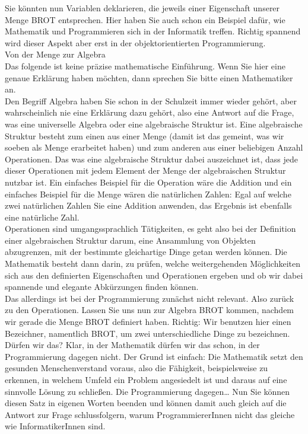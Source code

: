 Sie könnten nun Variablen deklarieren, die jeweils einer Eigenschaft unserer Menge BROT entsprechen. Hier haben Sie auch schon ein Beispiel dafür, wie Mathematik und Programmieren sich in der Informatik treffen. Richtig spannend wird dieser Aspekt aber erst in der objektorientierten Programmierung.\\

Von der Menge zur Algebra\\

Das folgende ist keine präzise mathematische Einführung. Wenn Sie hier eine genaue Erklärung haben möchten, dann sprechen Sie bitte einen Mathematiker an.\\

Den Begriff Algebra haben Sie schon in der Schulzeit immer wieder gehört, aber wahrscheinlich nie eine Erklärung dazu gehört, also eine Antwort auf die Frage, was eine universelle Algebra oder eine algebraische Struktur ist. Eine algebraische Struktur besteht zum einen aus einer Menge (damit ist das gemeint, was wir soeben als Menge erarbeitet haben) und zum anderen aus einer beliebigen Anzahl Operationen. Das was eine algebraische Struktur dabei auszeichnet ist, dass jede dieser Operationen mit jedem Element der Menge der algebraischen Struktur nutzbar ist. Ein einfaches Beispiel für die Operation wäre die Addition und ein einfaches Beispiel für die Menge wären die natürlichen Zahlen: Egal auf welche zwei natürlichen Zahlen Sie eine Addition anwenden, das Ergebnis ist ebenfalls eine natürliche Zahl.\\

Operationen sind umgangssprachlich Tätigkeiten, es geht also bei der Definition einer algebraischen Struktur darum, eine Ansammlung von Objekten abzugrenzen, mit der bestimmte gleichartige Dinge getan werden können. Die Mathematik besteht dann darin, zu prüfen, welche weitergehenden Möglichkeiten sich aus den definierten Eigenschaften und Operationen ergeben und ob wir dabei spannende und elegante Abkürzungen finden können.\\

Das allerdings ist bei der Programmierung zunächst nicht relevant. Also zurück zu den Operationen. Lassen Sie uns nun zur Algebra BROT kommen, nachdem wir gerade die Menge BROT definiert haben. Richtig: Wir benutzen hier einen Bezeichner, namentlich BROT, um zwei unterschiedliche Dinge zu bezeichnen. Dürfen wir das? Klar, in der Mathematik dürfen wir das schon, in der Programmierung dagegen nicht. Der Grund ist einfach: Die Mathematik setzt den gesunden Menschenverstand voraus, also die Fähigkeit, beispielsweise zu erkennen, in welchem Umfeld ein Problem angesiedelt ist und daraus auf eine sinnvolle Lösung zu schließen. Die Programmierung dagegen… Nun Sie können diesen Satz in eigenen Worten beenden und können damit auch gleich auf die Antwort zur Frage schlussfolgern, warum ProgrammiererInnen nicht das gleiche wie InformatikerInnen sind.\\

